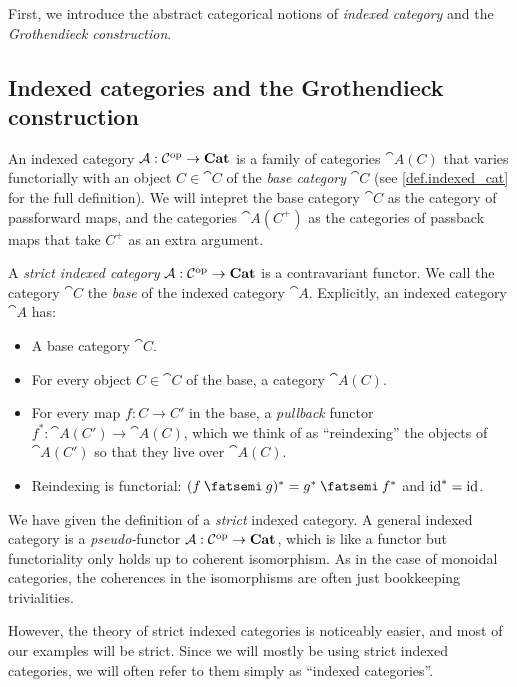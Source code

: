 \documentclass[DynamicalBook]{subfiles}
\begin{document}
First, we introduce the abstract categorical notions of \emph{indexed category}
and the \emph{Grothendieck construction}.




\subsection{Indexed categories and the Grothendieck construction}\label{sec.indexed_categories}

An indexed category $\mathcal{A} : \mathcal{C}^{\textnormal{op}} \to \textbf{Cat}$ is a family of
categories $\cat{A}(C)$ that varies functorially with an object $C \in \cat{C}$
of the \emph{base category} $\cat{C}$ (see \cref{def.indexed_cat} for the full
definition). We will intepret the base category $\cat{C}$ as the category of
passforward maps, and the categories $\cat{A}(C^+)$ as the categories of
passback maps that take $C^+$ as an extra argument.

\begin{definition}
  A \emph{strict indexed category} $\mathcal{A} : \mathcal{C}^{\textnormal{op}} \to \textbf{Cat}$ is a
  contravariant functor. We call the category $\cat{C}$ the
  \emph{base} of the indexed category $\cat{A}$. Explicitly, an indexed
  category $\cat{A}$ has:
  \begin{itemize}
  \item A base category $\cat{C}$.
  \item For every object $C \in \cat{C}$ of the base, a category $\cat{A}(C)$.
  \item For every map $f : C \to C'$ in the base, a \emph{pullback} functor
    $f^{\ast} : \cat{A}(C') \to \cat{A}(C)$, which we think of as ``reindexing''
    the objects of $\cat{A}(C')$ so that they live over $\cat{A}(C)$.
  \item Reindexing is functorial: $(f \then g)^{\ast} = g^{\ast} \then f^{\ast}$
    and $\mathrm{id}^{\ast} = \mathrm{id}$.
  \end{itemize}
\end{definition}

\begin{remark}\label{rmk.co(Pseudo-functoriality)}
    We have given the definition of a \emph{strict} indexed category. A general
    indexed category is a \emph{pseudo-}functor $\mathcal{A} : \mathcal{C}^{\textnormal{op}} \to
    \textbf{Cat}$, which is like a functor but functoriality only holds up to
    coherent isomorphism. As in the case of monoidal categories, the coherences
    in the isomorphisms are often just bookkeeping trivialities. 

However, the
    theory of strict indexed categories is noticeably easier, and most of our
    examples will be strict. Since we will mostly be using strict indexed
    categories, we will often refer to them simply as ``indexed categories''.
\end{remark}
\end{document}
